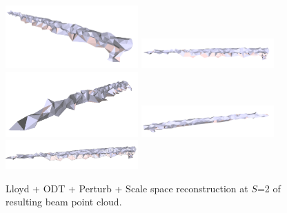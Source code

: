 \documentclass[12pt]{drexelthesis}
\begin{document}
\begin{figure}[!ht]
	\centering
		\includegraphics[width=2in]{real-lab-scans/meshed/optimized/scalespace2lloydodtperturb00.png}
		\includegraphics[width=2in]{real-lab-scans/meshed/optimized/scalespace2lloydodtperturb01.png}
		\includegraphics[width=2in]{real-lab-scans/meshed/optimized/scalespace2lloydodtperturb02.png}
		\includegraphics[width=2in]{real-lab-scans/meshed/optimized/scalespace2lloydodtperturb03.png}
		\includegraphics[width=2in]{real-lab-scans/meshed/optimized/scalespace2lloydodtperturb04.png}
		\caption[Lloyd + ODT + perturb +Scale space reconstruction at $S$=2 of segmented LiDAR data]{\centering Lloyd + ODT + Perturb + Scale space reconstruction at $S$=2 of resulting beam point cloud.}
	\label{lidar:scalespace2lloydodtperturb}
\end{figure}
\end{document}
